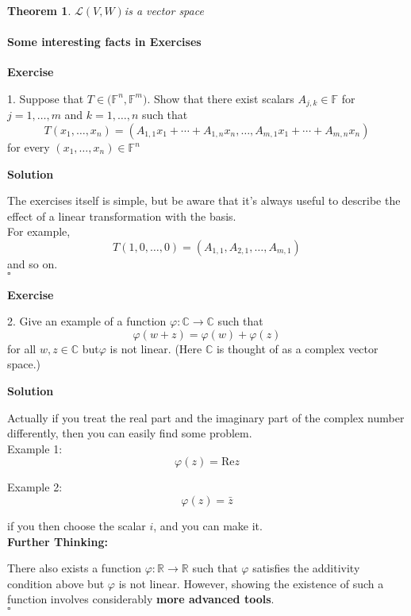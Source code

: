 \documentclass{article}
\newtheorem{theorem}{Theorem}[subsection]
\newenvironment{exercise}{%
{\textbf{Exercise\\}
    }
}{
}
\newenvironment{solution}{%
{
    \textbf{Solution\\}
    }
}{
  \hfill $\square$ 
  \par\bigskip 
}
\newcommand{\RR}{\mathbb{R}}
\newcommand{\CC}{\mathbb{C}}
\newcommand{\FF}{\mathbb{F}}
\begin{document}
\begin{CJK}{UTF8}{gkai}
\begin{theorem}
    $\mathcal{L}(V,W)$is a vector space\\
\end{theorem}

\paragraph{Some interesting facts in Exercises\\}

\begin{exercise}
1. Suppose that $T \in \mathcal(\FF^n,\FF^m)$. Show that there exist scalars $A_{j,k} \in \FF$ for $j = 1,\ldots,m$ and $k = 1,\ldots,n$ such that
\[T(x_1,\ldots,x_n) = (A_{1,1}x_1 + \cdots + A_{1,n}x_n,\ldots,A_{m,1}x_1 + \cdots + A_{m,n}x_n)\]
for every $(x_1,\ldots,x_n) \in \FF^n$\\
\end{exercise}

\begin{solution}
The exercises itself is simple, but be aware that it's always useful to describe the effect of a linear transformation with the basis.\\

For example,
\[T(1,0,\ldots,0) = (A_{1,1},A_{2,1},\ldots ,A_{m,1})\]
and so on.\\
\end{solution}

\begin{exercise}
2. Give an example of a function $\varphi : \CC \to \CC$ such that
\[\varphi (w+z) = \varphi (w)+\varphi (z)\]
for all $w,z \in \CC$ but$\varphi$ is not linear. (Here $\CC$ is thought of as a complex vector space.)\\
\end{exercise}

\begin{solution}
Actually if you treat the real part and the imaginary part of the complex number differently, then you can easily find some problem.\\

Example 1: 
\[\varphi(z) = \text{Re} z\]

Example 2:
\[\varphi(z) = \bar{z}\]

if you then choose the scalar $i$, and you can make it.\\

\textbf{Further Thinking:\\}

There also exists a function $\varphi : \RR \to \RR$ such that $\varphi$ satisfies the additivity condition above but $\varphi$ is not linear. However, showing the existence of such a function involves considerably \textbf{more advanced tools}.\\


\end{solution}
\end{CJK}
\end{document}
